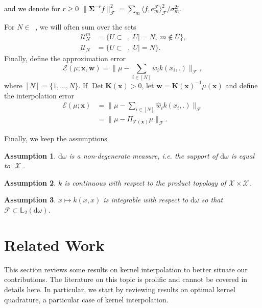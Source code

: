 \documentclass[twoside,11pt]{book}
\newcommand{\rev}[1]{\textcolor{black}{#1}}
\newtheorem{assumption}{Assumption}
\numberwithin{theorem}{chapter}
\numberwithin{definition}{chapter}
\numberwithin{proposition}{chapter}
\numberwithin{corollary}{chapter}
\numberwithin{example}{chapter}
\numberwithin{lemma}{chapter}
\numberwithin{assumption}{chapter}
\numberwithin{equation}{chapter}
\numberwithin{figure}{chapter}
\DeclareMathOperator{\Det}{Det}
\DeclareMathOperator{\Span}{\mathrm{Span}}
\DeclareMathOperator{\F}{\mathcal{F}}
\DeclareMathOperator{\X}{\mathcal{X}}
\DeclareMathOperator{\Ns}{\mathbb{N}^{*}}
\def\UN{\:\mathcal{U}_N}
\def\UNm{\:\mathcal{U}_N^m}
\newcommand{\rb}[1]{\textcolor{magenta}{#1}}
\begin{document}
\rev{ and we denote for $r\geq 0$ $\|\bm{\Sigma}^{-r}f\|_{\mathcal{F}}^{2} = \sum_{m} \langle f,e_{m}^{\mathcal{F}} \rangle_{\mathcal{F}}^{2}/\sigma_{m}^{2r}$.}

For $N \in \Ns$, we will often sum over the sets
\begin{align}
	\UNm &=  \{ U \subset \Ns, |U| = N,\: m \notin U \},\\
  \UN &=  \{ U \subset \Ns, |U| = N \}.
\end{align}
Finally, define the approximation error
\begin{equation}\label{CVS_def:E}
	\mathcal{E}(\mu;\bm{x},\bm{w}) = \|\mu - \sum\limits_{i \in [N]} w_{i} k(x_{i},.)\|_{\F},
\end{equation}
where $[N]=\{1,\dots,N\}$. If $\Det \bm{K}(\bm{x}) >0$, let $\hat{\bm{w}} = \bm{K}(\bm{x})^{-1} \mu(\bm{x})$ and define the interpolation error
\begin{align}\label{CVS_def:Ei}
	\mathcal{E}(\mu;\bm{x}) &= \|\mu - \sum\limits_{i \in [N]} \hat{w} _{i} k(x_{i},.)\|_{\F}\\
  & = \|\mu - \Pi_{\mathcal{T}(\bm{x})} \mu\|_{\F}.
\end{align}

Finally, we keep the assumptions
\begin{assumption}\label{CVS_hyp:domega_is_nondegenerate}
$\mathrm{d}\omega$ is a \emph{non-degenerate} measure, i.e. the support of $\mathrm{d}\omega$ is equal to $\X$.
\end{assumption}

\begin{assumption}\label{CVS_hyp:k_is_continuous}
$k$ is continuous with respect to the product topology of $\mathcal{X} \times \mathcal{X}$.
\end{assumption}

\begin{assumption}\label{CVS_hyp:integrable_diagonal}
$x \mapsto k(x,x)$ is integrable with respect to $\mathrm{d}\omega$ so that $\mathcal{F} \subset \mathbb{L}_{2}(\mathrm{d}\omega)$.
\end{assumption}



\section{Related Work}\label{CVS_s:relatedWork}
This section reviews some results on kernel interpolation to better situate our contributions. The literature on this topic is prolific and cannot be covered in details here. In particular, we start by reviewing results on optimal kernel quadrature, a particular case of kernel interpolation.
\end{document}
